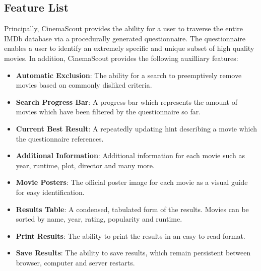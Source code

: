\documentclass{article}
\begin{document}
\subsection{Feature List}
Principally, CinemaScout provides the ability for a user to traverse the entire
IMDb database via a procedurally generated questionnaire. The questionnaire 
enables a user to identify an extremely specific and unique subset of high
quality movies. In addition, CinemaScout provides the following auxilliary 
features:
\begin{itemize}
\item \textbf{Automatic Exclusion}: The ability for a search to preemptively 
remove movies based on commonly disliked criteria.
\item \textbf{Search Progress Bar}: A progress bar which represents the amount
of movies which have been filtered by the questionnaire so far.
\item \textbf{Current Best Result}: A repeatedly updating hint describing a
movie which the questionnaire references.
\item \textbf{Additional Information}: Additional information for each
movie such as year, runtime, plot, director and many more.
\item \textbf{Movie Posters}: The official poster image for each movie as a 
visual guide for easy identification.
\item \textbf{Results Table}: A condensed, tabulated form of the results.
Movies can be sorted by name, year, rating, popularity and runtime.
\item \textbf{Print Results}: The ability to print the results in an easy to
read format.
\item \textbf{Save Results}: The ability to save results, which remain 
persistent between browser, computer and server restarts.
\end{itemize}
\end{document}
